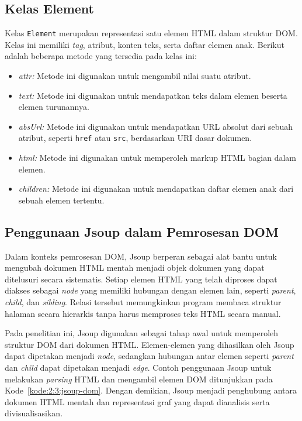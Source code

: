 \subsection{Kelas Element}
Kelas \texttt{Element} merupakan representasi satu elemen HTML dalam struktur DOM. Kelas ini memiliki \textit{tag}, atribut, konten teks, serta daftar elemen anak. Berikut adalah beberapa metode yang tersedia pada kelas ini:

\begin{itemize}[itemsep=0mm]
    \item \textit{attr:}
    Metode ini digunakan untuk mengambil nilai suatu atribut.
    
    \item \textit{text:}
    Metode ini digunakan untuk mendapatkan teks dalam elemen beserta elemen turunannya.
    
    \item \textit{absUrl:}
    Metode ini digunakan untuk mendapatkan URL absolut dari sebuah atribut, seperti \texttt{href} atau \texttt{src}, berdasarkan URI dasar dokumen.
    
    \item \textit{html:}
    Metode ini digunakan untuk memperoleh markup HTML bagian dalam elemen.
    
    \item \textit{children:}
    Metode ini digunakan untuk mendapatkan daftar elemen anak dari sebuah elemen tertentu.
\end{itemize}

\subsection{Penggunaan Jsoup dalam Pemrosesan DOM}
Dalam konteks pemrosesan DOM, Jsoup berperan sebagai alat bantu untuk mengubah dokumen HTML mentah menjadi objek dokumen yang dapat ditelusuri secara sistematis. Setiap elemen HTML yang telah diproses dapat diakses sebagai \textit{node} yang memiliki hubungan dengan elemen lain, seperti \textit{parent}, \textit{child}, dan \textit{sibling}. Relasi tersebut memungkinkan program membaca struktur halaman secara hierarkis tanpa harus memproses teks HTML secara manual.

Pada penelitian ini, Jsoup digunakan sebagai tahap awal untuk memperoleh struktur DOM dari dokumen HTML. Elemen-elemen yang dihasilkan oleh Jsoup dapat dipetakan menjadi \textit{node}, sedangkan hubungan antar elemen seperti \textit{parent} dan \textit{child} dapat dipetakan menjadi \textit{edge}. Contoh penggunaan Jsoup untuk melakukan \textit{parsing} HTML dan mengambil elemen DOM ditunjukkan pada Kode~\ref{kode:2:3:jsoup-dom}. Dengan demikian, Jsoup menjadi penghubung antara dokumen HTML mentah dan representasi graf yang dapat dianalisis serta divisualisasikan.

